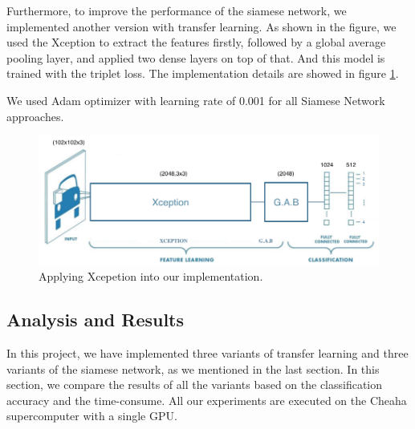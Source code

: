 Furthermore, to improve the performance of the siamese network, we implemented another version with transfer learning. As shown in the figure, we used the Xception to extract the features firstly, followed by a global average pooling layer, and applied two dense layers on top of that. And this model is trained with the triplet loss. The implementation details are showed in figure \ref{fig:xception_cnn}. 

We used Adam optimizer with learning rate of 0.001 for all Siamese Network approaches. 

\begin{figure}[h]
  \centering
  \includegraphics[width=\linewidth]{figs/xception_cnn.png}
  \caption{Applying  Xcepetion into our implementation.}
  \label{fig:xception_cnn}
\end{figure}

\subsection{Analysis and Results}
In this project, we have implemented three variants of transfer learning and three variants of the siamese network, as we mentioned in the last section. In this section, we compare the results of all the variants based on the classification accuracy and the time-consume. All our experiments are executed on the Cheaha supercomputer with a single GPU. 

